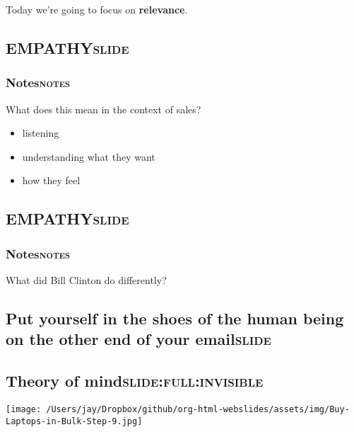 \documentclass[12pt]{article}
\begin{document}
Today we're going to focus on \textbf{relevance}.

\subsection[\textbf{EMPATHY}]{\textbf{EMPATHY}\hfill{}\textsc{slide}}
\label{sec:org28e388b}

\subsubsection[Notes]{Notes\hfill{}\textsc{notes}}
\label{sec:org56a5dc3}
What does this mean in the context of sales?

\begin{itemize}
\item listening
\item understanding what they want
\item how they feel
\end{itemize}

\subsection[\textbf{EMPATHY}]{\textbf{EMPATHY}\hfill{}\textsc{slide}}
\label{sec:orgacf5886}



\subsubsection[Notes]{Notes\hfill{}\textsc{notes}}
\label{sec:orge587dc9}
What did Bill Clinton do differently?

\subsection[Put yourself in the shoes of the human being on the other end of your email]{Put yourself in the shoes of the human being on the other end of your email\hfill{}\textsc{slide}}
\label{sec:org0645c91}

\subsection[Theory of mind]{Theory of mind\hfill{}\textsc{slide:full:invisible}}
\label{sec:orge91894b}
\begin{center}
\texttt{[image: /Users/jay/Dropbox/github/org-html-webslides/assets/img/Buy-Laptops-in-Bulk-Step-9.jpg]}
\end{center}
\end{document}
